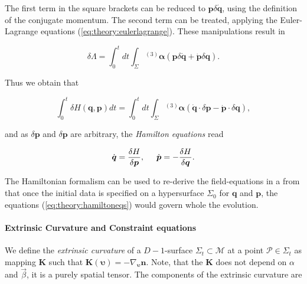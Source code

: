 {    The first term in the square brackets can be reduced to $\boldsymbol{p}\delta\dot{\boldsymbol{q}}$, using the definition of the conjugate momentum. 
    The second term can be treated, applying the Euler-Lagrange equations (\ref{eq:theory:eulerlagrange}). 
    These manipulations result in
    
    \begin{equation}
    \delta\Lambda = \int_{0}^{t}dt\int_{\Sigma}{^{(3)}\boldsymbol{\alpha}}(\boldsymbol{p}\delta\dot{\boldsymbol{q}} + \dot{\boldsymbol{p}}\delta\boldsymbol{q}).
    \end{equation}
    
    Thus we obtain that 
    
    \begin{equation}
    \int_{0}^{t} \delta H(\boldsymbol{q},\boldsymbol{p})dt =   \int_{0}^{t}dt\int_{\Sigma}{^{(3)}\boldsymbol{\alpha}}(\dot{\boldsymbol{q}}\cdot\delta\boldsymbol{p}-\dot{\boldsymbol{p}}\cdot\delta\boldsymbol{q}),
    \end{equation}
    
    and as $\delta\boldsymbol{p}$ and $\delta\boldsymbol{p}$ are arbitrary, the \textit{Hamilton equations} read
    
    \begin{equation}
    \dot{\boldsymbol{q}}=\frac{\delta H}{\delta\boldsymbol{p}}, \hspace{5mm} \dot{\boldsymbol{p}} = -\frac{\delta H}{\delta\boldsymbol{q}}.
    \label{eq:theory:hamiltoneqs}
    \end{equation}
    
    The Hamiltonian formalism can be used to re-derive the field-equations in a from that once the initial data is specified on a hypersurface $\Sigma_0$ for $\boldsymbol{q}$ and $\boldsymbol{p}$, the equations (\ref{eq:theory:hamiltoneqs}) would govern whole the evolution.
    
    
    \paragraph{Extrinsic Curvature and Constraint equations}
    
    
    We define the \textit{extrinsic curvature} of a $D-1$-surface $\Sigma_t\subset\mathcal{M}$ at a point $\mathcal{P}\in\Sigma_t$ as mapping $\boldsymbol{K}$ such that $\boldsymbol{K}(\boldsymbol{\upsilon})=-\nabla_{\boldsymbol{\upsilon}}\boldsymbol{n}$. 
    Note, that the $\boldsymbol{K}$ does not depend on $\alpha$ and $\vec{\beta}$, it is a purely spatial tensor. 
    The components of the extrinsic curvature are 
    
}
